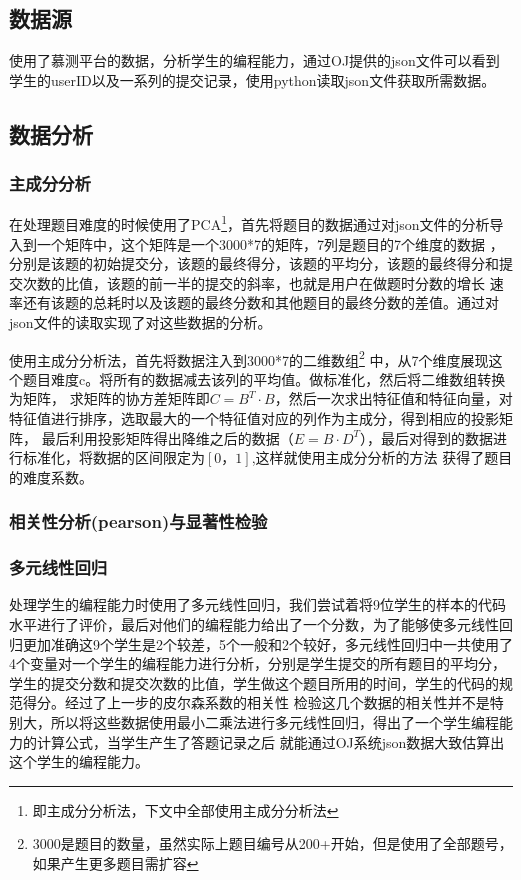 \documentclass[UTF8]{ctexart}
\begin{document}
\subsection{数据源}
使用了慕测平台的数据，分析学生的编程能力，通过OJ提供的json文件可以看到学生的userID以及一系列的提交记录，使用python读取json文件获取所需数据。
\subsection{数据分析}
\subsubsection{主成分分析}
在处理题目难度的时候使用了PCA\footnote{即主成分分析法，下文中全部使用主成分分析法}，首先将题目的数据通过对json文件的分析导入到一个矩阵中，这个矩阵是一个3000*7的矩阵，7列是题目的7个维度的数据
，分别是该题的初始提交分，该题的最终得分，该题的平均分，该题的最终得分和提交次数的比值，该题的前一半的提交的斜率，也就是用户在做题时分数的增长
速率还有该题的总耗时以及该题的最终分数和其他题目的最终分数的差值。通过对json文件的读取实现了对这些数据的分析。

使用主成分分析法，首先将数据注入到3000*7的二维数组\footnote{3000是题目的数量，虽然实际上题目编号从200+开始，但是使用了全部题号，如果产生更多题目需扩容}
中，从7个维度展现这个题目难度c。将所有的数据减去该列的平均值。做标准化，然后将二维数组转换为矩阵，
求矩阵的协方差矩阵即$C=B^T \cdot B$，然后一次求出特征值和特征向量，对特征值进行排序，选取最大的一个特征值对应的列作为主成分，得到相应的投影矩阵，
最后利用投影矩阵得出降维之后的数据（$E = B \cdot D^T$），最后对得到的数据进行标准化，将数据的区间限定为$[0，1]$,这样就使用主成分分析的方法
获得了题目的难度系数。
\subsubsection{相关性分析(pearson)与显著性检验}
\subsubsection{多元线性回归}
处理学生的编程能力时使用了多元线性回归，我们尝试着将9位学生的样本的代码水平进行了评价，最后对他们的编程能力给出了一个分数，为了能够使多元线性回
归更加准确这9个学生是2个较差，5个一般和2个较好，多元线性回归中一共使用了4个变量对一个学生的编程能力进行分析，分别是学生提交的所有题目的平均分，
学生的提交分数和提交次数的比值，学生做这个题目所用的时间，学生的代码的规范得分。经过了上一步的皮尔森系数的相关性
检验这几个数据的相关性并不是特别大，所以将这些数据使用最小二乘法进行多元线性回归，得出了一个学生编程能力的计算公式，当学生产生了答题记录之后
就能通过OJ系统json数据大致估算出这个学生的编程能力。
\end{document}
